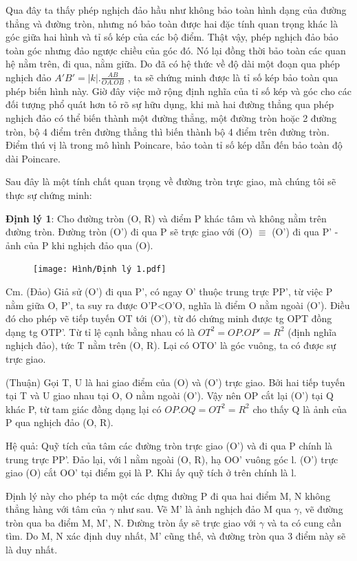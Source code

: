 \begin{multicols}{2}
	Qua đây ta thấy phép nghịch đảo hầu như không bảo toàn hình dạng của đường thẳng và đường tròn, nhưng nó bảo toàn được hai đặc tính quan trọng khác là góc giữa hai hình và tỉ số kép của các bộ điểm. Thật vậy, phép nghịch đảo bảo toàn góc nhưng đảo ngược chiều của góc đó. Nó lại đồng thời bảo toàn các quan hệ nằm trên, đi qua, nằm giữa. Do đã có hệ thức về độ dài một đoạn qua phép nghịch đảo  $A'B' = |k|. \frac{AB}{OA.OB}$ , ta sẽ chứng minh được là tỉ số kép bảo toàn qua phép biến hình này. Giờ đây việc mở rộng định nghĩa của tỉ số kép và góc cho các đối tượng phổ quát hơn tỏ rõ sự hữu dụng, khi mà hai đường thẳng qua phép nghịch đảo có thể biến thành một đường thẳng, một đường tròn hoặc 2 đường tròn, bộ 4 điểm trên đường thẳng thì biến thành bộ 4 điểm trên đường tròn. Điểm thú vị là trong mô hình Poincare, bảo toàn tỉ số kép dẫn đến bảo toàn độ dài Poincare.
	
	Sau đây là một tính chất quan trọng về đường tròn trực giao, mà chúng tôi sẽ thực sự chứng minh:
	
	\textbf{\color{lichsutoanhoc}Định lý 1}: Cho đường tròn (O, R) và điểm P khác tâm và không nằm trên đường tròn. Đường tròn (O') đi qua P sẽ trực giao với (O) $ \equiv$ (O') đi qua P' - ảnh của P khi nghịch đảo qua (O).
	
	\begin{figure}[ht]
		\texttt{[image: Hình/Định lý 1.pdf]}
	\end{figure}
	
	
	Cm. (Đảo) Giả sử (O') đi qua P', có ngay O' thuộc trung trực PP', từ việc P nằm giữa O, P', ta suy ra được O'P<O'O, nghĩa là điểm O nằm ngoài (O'). Điều đó cho phép vẽ tiếp tuyến OT tới (O'), từ đó chứng minh được tg OPT đồng dạng tg OTP'. Từ tỉ lệ cạnh bằng nhau có là $OT^2 = OP.OP' = R^2$ (định nghĩa nghịch đảo), tức T nằm trên (O, R). Lại có OTO' là góc vuông, ta có được sự trực giao.
	
	(Thuận) Gọi T, U là hai giao điểm của (O) và (O') trực giao. Bởi hai tiếp tuyến tại T và U giao nhau tại O, O nằm ngoài (O'). Vậy nên OP cắt lại (O') tại Q khác P, từ tam giác đồng dạng lại có $OP.OQ = OT^2 = R^2$ cho thấy Q là ảnh của P qua nghịch đảo (O, R).
	
	Hệ quả: Quỹ tích của tâm các đường tròn trực giao (O') và đi qua P chính là trung trực PP'.
	Đảo lại, với l nằm ngoài (O, R), hạ OO' vuông góc l. (O') trực giao (O) cắt OO' tại điểm gọi là P. Khi ấy quỹ tích ở trên chính là l.
	
	Định lý này cho phép ta một các dựng đường P đi qua hai điểm M, N không thẳng hàng với tâm của $\gamma$ như sau. Vẽ M' là ảnh nghịch đảo M qua $\gamma$, vẽ đường tròn qua ba điểm M, M', N. Đường tròn ấy sẽ trực giao với $\gamma$ và ta có cung cần tìm. Do M, N xác định duy nhất, M' cũng thế, và đường tròn qua 3 điểm này sẽ là duy nhất.
	

\end{multicols}
